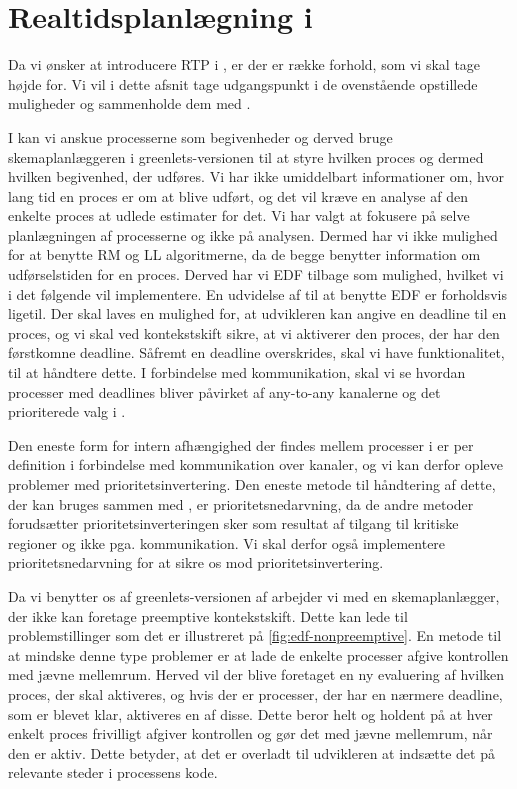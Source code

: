 \section{Realtidsplanlægning i \pycsp}
\label{sec:rtp-pycsp}
Da vi ønsker at introducere RTP i \pycsp, er der er række forhold, som vi skal tage højde for. Vi vil i dette afsnit tage udgangspunkt i de ovenstående opstillede muligheder og sammenholde dem med \pycsp. 

I \pycsp kan vi anskue processerne som begivenheder og derved bruge skemaplanlæggeren i greenlets-versionen til at styre hvilken proces og dermed hvilken begivenhed, der udføres. Vi har ikke umiddelbart informationer om, hvor lang tid en proces er om at blive udført, og det vil kræve en analyse af den enkelte proces at udlede estimater for det. Vi har valgt at fokusere på selve planlægningen af processerne og ikke på analysen. Dermed har vi ikke mulighed for at benytte RM og LL algoritmerne, da de begge benytter information om udførselstiden for en proces. Derved har vi EDF tilbage som mulighed, hvilket vi i det følgende vil implementere. En udvidelse af \pycsp til at benytte EDF er forholdsvis ligetil. Der skal laves en mulighed for, at udvikleren kan angive en deadline til en proces, og vi skal ved kontekstskift sikre, at vi aktiverer den proces, der har den førstkomne deadline. Såfremt en deadline overskrides, skal vi have funktionalitet, til at håndtere dette. 
I forbindelse med kommunikation, skal vi se hvordan processer med deadlines bliver påvirket af  any-to-any kanalerne og det prioriterede valg i .

Den eneste form for intern afhængighed der findes mellem processer i \pycsp er per definition i forbindelse med kommunikation over kanaler, og vi kan derfor opleve problemer med prioritetsinvertering. Den eneste metode til håndtering af dette, der kan bruges sammen med \pycsp, er prioritetsnedarvning, da de andre metoder forudsætter prioritetsinverteringen  sker som resultat af tilgang til kritiske regioner og ikke pga. kommunikation. Vi skal derfor også implementere prioritetsnedarvning for at sikre os mod prioritetsinvertering. 

Da vi benytter os af greenlets-versionen af \pycsp arbejder vi med en skemaplanlægger, der ikke kan foretage preemptive kontekstskift. Dette kan lede til problemstillinger som det er illustreret på \cref{fig:edf-nonpreemptive}. En metode til at mindske denne type problemer er at lade de enkelte processer afgive kontrollen med jævne mellemrum. Herved vil der blive foretaget en ny evaluering af hvilken proces, der skal aktiveres, og hvis der er processer, der har en nærmere deadline, som er blevet klar, aktiveres en af disse. Dette beror helt og holdent på at hver enkelt proces frivilligt afgiver kontrollen og gør det med jævne mellemrum, når den er aktiv. Dette betyder, at det er overladt til udvikleren at indsætte det på relevante steder i processens kode. 

